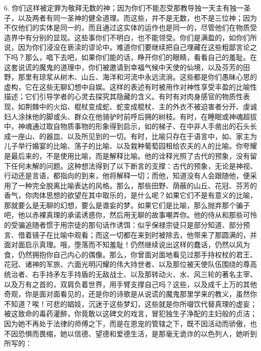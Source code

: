 6. 你们这样被定罪为敬拜无数的神；因为你们不能忍受那教导独一天主有独一圣子，以及两者有同一圣神的健全道理。而这些，并不是无数，也不是三位神；因为不仅他们的实体是同一的，而且通过这实体的运作也是同一的，尽管他们在物质受造界中有分别的显现。这些事你们不明白，也不能领受。你们是满盈的，如你们所说，因为你们浸没在亵渎的谬论中。难道你们要继续把自己埋藏在这些粗鄙言论之下吗？那么，唱下去吧，如果你们能的话，睁开你们的眼睛，看看自己的羞耻。在这套说谎的魔鬼的道理中，你们被邀请到幸福气候中天使的仙境，以及芬芳的田野，那里有琼浆从树木、山丘、海洋和河流中永远流淌。这些都是你们愚昧心思的虚构，它在这些无聊幻想中自娱。这样的表述有时被用作对神性享受丰盈的比喻性描述；它们引导学者的心灵去探究其隐藏的含义。有时有对肉身感官的物质性表现，如荆棘中的火焰、棍杖变成蛇、蛇变成棍杖、主的外衣不被迫害者分开、虔诚妇人涂抹他的脚或头、群众在他骑驴时前呼后拥的树枝。有时，在睡眠或神魂超拔中，神魂通过取自物质事物的形象得到启示，如的梯子、在中非人手凿出的石头长成一座山、的器皿、以及所见到的一切。有时，比喻只存在于语言中，如、家主为儿子举行婚宴的比喻、荡子的比喻、以及栽种葡萄园租给农夫的人的比喻。你夸耀是最后来的，不是使用比喻，而是解释比喻。他的诠释光照了古代的预象，没有留下任何未解的问题。这种想法得到了以下断言的支撑：古代的预象，无论是神视、行动还是言语，都指向的到来，他将解释一切；而他，知道没有人会跟随他，便采用了一种完全脱离比喻表达的风格。那么，那些田野、荫蔽的山丘、花冠、芬芳的香气，你肉体思想的欲望在其中取乐的，是什么呢？如果它们不是有意义的比喻，那就要么是无聊的幻想，要么是谵妄的梦。如果它们是比喻，那么抛弃那个骗子吧，他以赤裸真理的承诺诱惑你，然后用无聊的故事嘲弄你。他的侍从和那些可怜的受骗追随者惯于用宗徒的那句话作诱饵：似乎保禄宗徒只是部分知道、部分预言、借着镜子在比喻中观看；而这一切都在来到时被除去，他带来了那圆满的，并面对面启示真理。哦，堕落而不知羞耻！仍然继续说出这样的蠢话，仍然以风为食，仍然拥抱你自己内心的偶像。那么，你曾面对面地看见过那手持权杖的君王、花冠、诸神的军旅、六面光明闪耀的伟大持世者、以及那位被天使队伍围绕的尊高统治者、右手持矛左手持盾的无敌战士、以及那转动火、水、风三轮的著名主宰、以及万有之首的，双肩负着世界，用手臂支撑自己吗？这些，以及成千上万的其他奇观，你是面对面看见的，还是你的诗歌是从说谎的魔鬼那里学来的教义，虽然你不知道？唉！可悲的娼妓，沉迷于这些梦幻，这些就是你所啜饮代替真理的虚妄；被这致命的毒药灌醉，你竟敢以这碑文的戏言，冒犯独生子净配的主妇般的贞洁；因为她不再处于法律的师傅之下，而是在恩宠的管辖之下，既不因活动而骄傲，也不因恐惧而畏缩，她以信德、望德和爱德生活，是那毫无诡诈的以色列人，她听到所写的：\par

